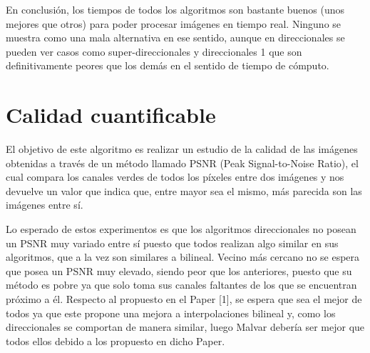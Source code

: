 \documentclass[10pt, a4paper]{article}
\begin{document}
En conclusi\'on, los tiempos de todos los algoritmos son bastante buenos (unos mejores que otros) para poder procesar im\'agenes en tiempo real. Ninguno se muestra como una mala alternativa en ese sentido, aunque en direccionales se pueden ver casos como super-direccionales y direccionales 1 que son definitivamente peores que los dem\'as en el sentido de tiempo de c\'omputo. 

\section{Calidad cuantificable}

El objetivo de este algoritmo es realizar un estudio de la calidad de las im\'agenes obtenidas a trav\'es de un m\'etodo llamado PSNR (Peak Signal-to-Noise Ratio), el cual compara los canales verdes de todos los p\'ixeles entre dos im\'agenes y nos devuelve un valor que indica que, entre mayor sea el mismo, m\'as parecida son las im\'agenes entre s\'i. 

Lo esperado de estos experimentos es que los algoritmos direccionales no posean un PSNR muy variado entre s\'i puesto que todos realizan algo similar en sus algoritmos, que a la vez son similares a bilineal. Vecino m\'as cercano no se espera que posea un PSNR  muy elevado, siendo peor que los anteriores, puesto que su m\'etodo es pobre ya que solo toma sus canales faltantes de los que se encuentran pr\'oximo a \'el. Respecto al propuesto en el Paper [1], se espera que sea el mejor de todos ya que este propone una mejora a interpolaciones bilineal y, como los direccionales se comportan de manera similar, luego Malvar deber\'ia ser mejor que todos ellos debido a los propuesto en dicho Paper. 
 
\end{document}
